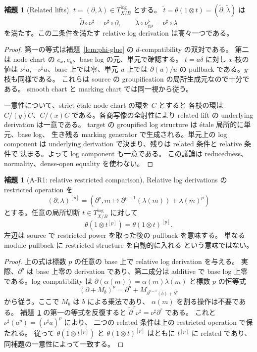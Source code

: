 \documentclass[11pt,a4paper]{article}
\numberwithin{equation}{section}
\theoremstyle{definition}
\newtheorem{lemma}[definition]{補題}
\begin{document}
\begin{lemma}[Related lifts]\label{lem:related-lifts}
\(t=(\partial,\lambda)\in T^{\log}_{X/B}\) とする。
\(\widetilde t=\theta(1\otimes t)
  =(\widetilde\partial,\widetilde\lambda)\) は
\[
 \widetilde\partial\circ\nu^\sharp=\nu^\sharp\circ\partial,
 \qquad
 \widetilde\lambda\circ\nu^\flat_{\mathrm{gp}}
       =\nu^\sharp\circ\lambda
\]
を満たす。この二条件を満たす relative log derivation は高々一つである。
\end{lemma}

\begin{proof}
第一の等式は補題~\ref{lem:phi-glue} の \(d\)-compatibility の双対である。
第二は node chart の \(e_x,e_y\)、base log の元、単元で確認する。
\(t=a\delta\) に対し \(x\)-枝の値は
\(\nu^\sharp a,-\nu^\sharp a\)、base 上では零、単元 \(u\) 上では
\(\partial(u)/u\) の pullback である。\(y\)-枝も同様である。
これらは source の groupification の局所生成元なので十分である。
smooth chart と marking chart では同一視から従う。

一意性について、strict étale node chart の環を \(C\) とすると
各枝の環は \(C/(y)C\)、\(C/(x)C\) である。各商写像の全射性により
related lift の underlying derivation は一意である。
target の groupified log structure は étale 局所的に単元、base log、
生き残る marking generator で生成される。単元上の log component は
underlying derivation で決まり、残りは related 条件と relative 条件で
決まる。よって log component も一意である。
この議論は reducedness、normality、dense-open equality を使わない。
\end{proof}

\begin{lemma}[A-R1: relative restricted comparison]\label{lem:AR1}
Relative log derivations の restricted operation を
\[
 (\partial,\lambda)^{[p]}
  =\left(\partial^p,
       m\longmapsto\partial^{p-1}(\lambda(m))+\lambda(m)^p\right)
\]
とする。任意の局所切断 \(t\in T^{\log}_{X/B}\) に対して
\[
 \theta(1\otimes t^{[p]})=\theta(1\otimes t)^{[p]}.
\]
左辺は source で restricted power を取った後の pullback を意味する。
単なる module pullback に restricted structure を自動的に入れる
という意味ではない。
\end{lemma}

\begin{proof}
上の式は標数 \(p\) の任意の base 上で relative log derivation を与える。
実際、\(\partial^p\) は base 上零の derivation であり、第二成分は
additive で base log 上零である。log compatibility は
\(\partial(\alpha(m))=\alpha(m)\lambda(m)\) と標数 \(p\) の恒等式
\[
 (\partial+M_b)^p
   =\partial^p+M_{\partial^{p-1}(b)+b^p}
\]
から従う。ここで \(M_b\) は \(b\) による乗法であり、
\(\alpha(m)\) を割る操作は不要である。
補題~\ref{lem:related-lifts} の第一の等式を反復すると
\(\widetilde\partial^{\,r}\nu^\sharp
   =\nu^\sharp\partial^r\) である。
これと \(\nu^\sharp(a^p)=(\nu^\sharp a)^p\) により、
二つの related 条件は上の restricted operation で保たれる。
従って \(\theta(1\otimes t^{[p]})\) と
\(\theta(1\otimes t)^{[p]}\) はともに \(t^{[p]}\) に related であり、
同補題の一意性によって一致する。
\end{proof}
\end{document}
